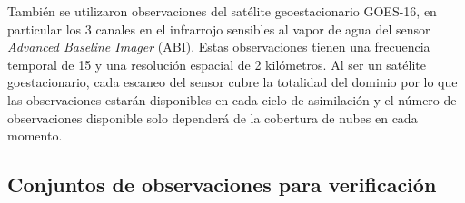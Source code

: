 \documentclass[12pt,oneside]{reedthesis}
\begin{document}
También se utilizaron observaciones del satélite geoestacionario GOES-16, en particular los 3 canales en el infrarrojo sensibles al vapor de agua del sensor \emph{Advanced Baseline Imager} (ABI). Estas observaciones tienen una frecuencia temporal de 15 y una resolución espacial de 2 kilómetros. Al ser un satélite goestacionario, cada escaneo del sensor cubre la totalidad del dominio por lo que las observaciones estarán disponibles en cada ciclo de asimilación y el número de observaciones disponible solo dependerá de la cobertura de nubes en cada momento.

\hypertarget{conjuntos-de-observaciones-para-verificaciuxf3n}{%
\subsection{Conjuntos de observaciones para verificación}\label{conjuntos-de-observaciones-para-verificaciuxf3n}}
\end{document}
